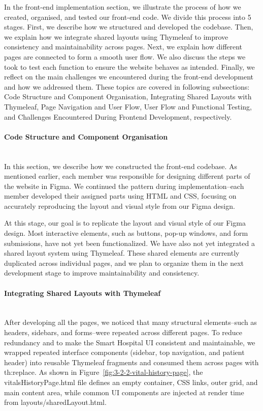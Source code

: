 In the front-end implementation section, we illustrate the process of how we created, organised, and tested our front-end code. We divide this process into 5 stages. First, we describe how we structured and developed the codebase. Then, we explain how we integrate shared layouts using Thymeleaf to improve consistency and maintainability across pages. Next, we explain how different pages are connected to form a smooth user flow. We also discuss the steps we took to test each function to ensure the website behaves as intended. Finally, we reflect on the main challenges we encountered during the front-end development and how we addressed them. These topics are covered in following subsections: Code Structure and Component Organisation, Integrating Shared Layouts with Thymeleaf, Page Navigation and User Flow, User Flow and Functional Testing, and Challenges Encountered During Frontend Development, respectively.
\paragraph{Code Structure and Component Organisation}\mbox{}\\
In this section, we describe how we constructed the front-end codebase. As mentioned earlier, each member was responsible for designing different parts of the website in Figma. We continued the pattern during implementation–each member developed their assigned parts using HTML and CSS, focusing on accurately reproducing the layout and visual style from our Figma design.

At this stage, our goal is to replicate the layout and visual style of our Figma design. Most interactive elements, such as buttons, pop-up windows, and form submissions, have not yet been functionalized. We have also not yet integrated a shared layout system using Thymeleaf. These shared elements are currently duplicated across individual pages, and we plan to organize them in the next development stage to improve maintainability and consistency.

\paragraph{Integrating Shared Layouts with Thymeleaf}\mbox{}\\
After developing all the pages, we noticed that many structural elements–such as headers, sidebars, and forms–were repeated across different pages. To reduce redundancy and to make the Smart Hospital UI consistent and maintainable, we wrapped repeated interface components (sidebar, top navigation, and patient header) into reusable Thymeleaf fragments and consumed them across pages with th:replace. As shown in Figure~\ref{fig:3-2-2-vital-history-page}, the vitalsHistoryPage.html file defines an empty container, CSS links, outer grid, and main content area, while common UI components are injected at render time from layouts/sharedLayout.html.

